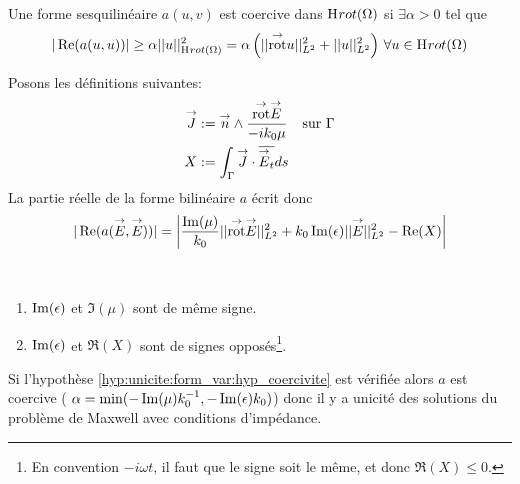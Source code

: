 			\begin{defn}[Coercivité]
				Une forme sesquilinéaire $a(u,v)$ est coercive dans $\mathrm{H}_\mathrm{{}}{rot}(\Omega)$ si $\exists \alpha > 0$ tel que 
				\[
					|\operatorname{Re}(a(u,u))| \ge \alpha ||u||_{\mathrm{H}_\mathrm{{}}{rot}(\Omega)}^2 = \alpha \left( || {{\overset{\rightarrow}{\operatorname{rot}}}} u ||_{L^2}^2 + || u ||_{L^2}^2\right) \, \forall u \in \mathrm{H}_\mathrm{{}}{rot}(\Omega)
				\]
			 \end{defn}


			Posons les définitions suivantes:
			\begin{align*}
				{\overset{\rightarrow}{J}} &:=  {\overset{\rightarrow}{n}} \wedge \dfrac{{{\overset{\rightarrow}{\operatorname{rot}}}} {\overset{\rightarrow}{E}}}{-ik_0\mu} && \text{sur $\Gamma$}
				\\X&:= \int_\Gamma {\overset{\rightarrow}{J}} \cdot {\overline{{\overset{\rightarrow}{E}}_t}} ds
			\end{align*}
			La partie réelle de la forme bilinéaire $a$ écrit donc
			\begin{equation}
				\label{eq:unicite:form_var:decomp_form_bilin_1}
				|\operatorname{Re}(a({\overset{\rightarrow}{E}},{\overset{\rightarrow}{E}}))| = \left|\dfrac{\operatorname{Im}(\mu)}{k_0} || {{\overset{\rightarrow}{\operatorname{rot}}}} {\overset{\rightarrow}{E}} ||_{L^2}^2  + k_0 \operatorname{Im}(\epsilon) || {\overset{\rightarrow}{E}} ||_{L^2}^2
				- \operatorname{Re}(X)\right|
			\end{equation}

			\begin{hyp}\label{hyp:unicite:form_var:hyp_coercivite}
				~{}

				\begin{enumerate}
					\item $\operatorname{Im}(\epsilon)$ et $\Im(\mu)$ sont de même signe.
					\item $\operatorname{Im}(\epsilon)$ et $\Re(X)$ sont de signes opposés\footnote{En convention $-i\omega t$, il faut que le signe soit le même, et donc $\Re(X) \le 0$.}.
				\end{enumerate}
			\end{hyp}

			Si l'hypothèse \ref{hyp:unicite:form_var:hyp_coercivite} est vérifiée alors $a$ est coercive ( $\alpha = \min(-\operatorname{Im}(\mu)k_0^{-1},-\operatorname{Im}(\epsilon)k_0)$) donc il y a unicité des solutions du problème de Maxwell avec conditions d'impédance.

